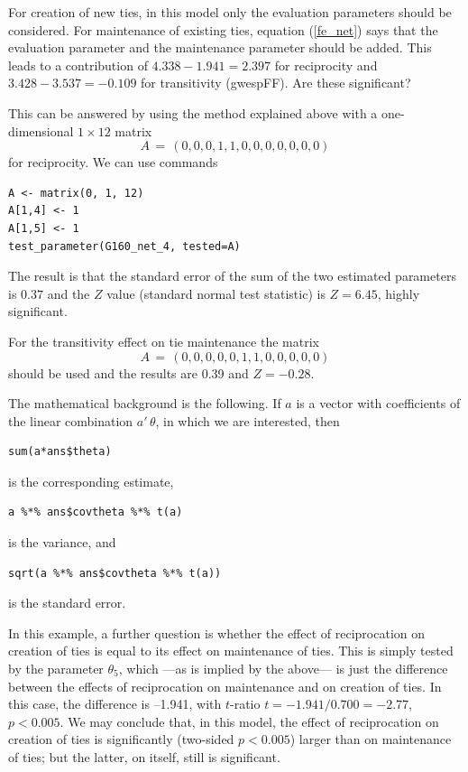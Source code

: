 \documentclass[a4paper,fleqn,11pt]{article}
\newcommand{\+}{\, + \,}
\begin{document}
\noindent
For creation of new ties, in  this model only the evaluation parameters
should be considered. For maintenance of existing ties, equation (\ref{fe_net})
says that the evaluation parameter and the maintenance parameter
should be added.
This leads to a contribution of  $4.338 -1.941 = 2.397$ for reciprocity
and $3.428 - 3.537= -0.109$ for transitivity (gwespFF). Are these significant?

This can be answered by using the method explained above with
a one-dimensional $ 1 \times  12$ matrix
\[
  A \,=\,  ( 0, 0, 0, 1, 1, 0, 0, 0, 0,  0,  0,  0 )
\]
for reciprocity. We can use commands
\begin{verbatim}
A <- matrix(0, 1, 12)
A[1,4] <- 1
A[1,5] <- 1
test_parameter(G160_net_4, tested=A)
\end{verbatim}
The result is that the standard error of the sum of the two
estimated parameters is $0.37$
and the $Z$ value (standard normal test statistic) is  $Z = 6.45$,
highly significant.

For the transitivity effect on tie maintenance the matrix
\[
  A \,=\,  ( 0, 0, 0, 0, 0, 1, 1, 0, 0,  0,  0,  0 )
\]
should be used and the results are 0.39 and $Z= -0.28$.

The mathematical background is the following.
If $a$ is a vector with coefficients of the linear combination
$a'\,\theta$, in which we are interested, then
\begin{verbatim}
sum(a*ans$theta)
\end{verbatim}
 is the corresponding estimate,
\begin{verbatim}
a %*% ans$covtheta %*% t(a)
\end{verbatim}
is the variance, and
\begin{verbatim}
sqrt(a %*% ans$covtheta %*% t(a))
\end{verbatim}
is the standard error.

In this example, a further question is whether the effect of reciprocation
on creation of ties is equal to its effect on maintenance of ties.
This is simply tested by the parameter $\theta_5$, which ---as is implied
by the above--- is just the difference between the effects of reciprocation
on maintenance and on creation of ties. In this case, the difference is --1.941,
with $t$-ratio $t = -1.941/0.700 = -2.77$, $p < 0.005$.
We may conclude that, in this model, the effect of reciprocation on
creation of ties is significantly (two-sided $p < 0.005$) larger than
on maintenance of ties; but the latter, on itself,
still is significant.
\end{document}
